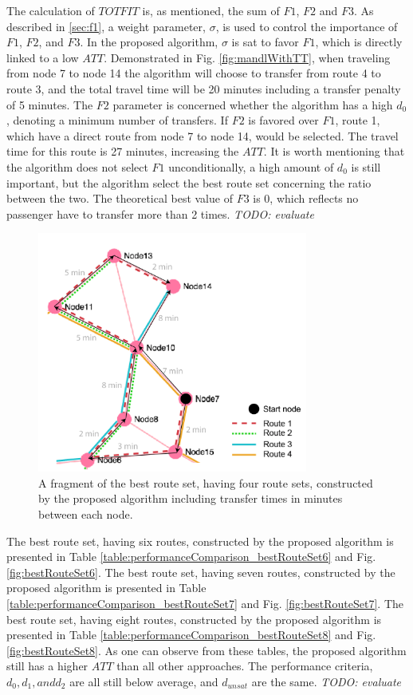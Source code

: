 The calculation of $TOTFIT$ is, as mentioned, the sum of $F1$, $F2$ and $F3$. As described in \vref{sec:f1}, a weight parameter, $\sigma$, is used to control the importance of $F1$, $F2$, and $F3$. In the proposed algorithm, $\sigma$ is sat to favor $F1$, which is directly linked to a low $ATT$. Demonstrated in Fig. \vref{fig:mandlWithTT}, when traveling from node 7 to node 14 the algorithm will choose to transfer from route 4 to route 3, and the total travel time will be 20 minutes including a transfer penalty of 5 minutes. The $F2$ parameter is concerned whether the algorithm has a high $d_0$, denoting a minimum number of transfers. If $F2$ is favored over $F1$, route 1, which have a direct route from node 7 to node 14, would be selected. The travel time for this route is 27 minutes, increasing the $ATT$. It is worth mentioning that the algorithm does not select $F1$ unconditionally, a high amount of $d_0$ is still important, but the algorithm select the best route set concerning the ratio between the two. The theoretical best value of $F3$ is 0, which reflects no passenger have to transfer more than 2 times. \emph{\color{blue} TODO: evaluate}

\begin{figure}[H]
    \begin{center}
    \includegraphics[width=3.5in]{assets/mandl_withTT_utsnitt.png}
    \end{center}
    \caption{A fragment of the best route set, having four route sets, constructed by the proposed algorithm including transfer times in minutes between each node.}
    \label{fig:mandlWithTT} 
\end{figure}

The best route set, having six routes, constructed by the proposed algorithm is presented in Table \vref{table:performanceComparison_bestRouteSet6} and Fig. \vref{fig:bestRouteSet6}.  The best route set, having seven routes, constructed by the proposed algorithm is presented in Table \vref{table:performanceComparison_bestRouteSet7} and Fig. \vref{fig:bestRouteSet7}. The best route set, having eight routes, constructed by the proposed algorithm is presented in Table \vref{table:performanceComparison_bestRouteSet8} and Fig. \vref{fig:bestRouteSet8}. As one can observe from these tables, the proposed algorithm still has a higher $ATT$ than all other approaches. The performance criteria, $d_0, d_1, and d_{2}$ are all still below average, and $d_{unsat}$ are the same. \emph{\color{blue} TODO: evaluate}


